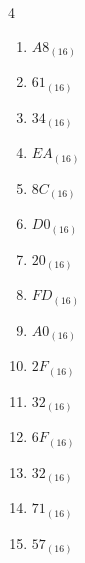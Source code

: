 \begin{multicols}{4}
\begin{enumerate}
        \phantom{$=161$}

\columnbreak %

\resetques

  \item $A8_{(16)}$

        \phantom{$=168$}

  \item $61_{(16)}$

        \phantom{$=97$}

  \item $34_{(16)}$

        \phantom{$=52$}

  \item $EA_{(16)}$

        \phantom{$=234$}

  \item $8C_{(16)}$

        \phantom{$=140$}

  \item $D0_{(16)}$

        \phantom{$=208$}

  \item $20_{(16)}$

        \phantom{$=32$}

  \item $FD_{(16)}$

        \phantom{$=253$}

  \item $A0_{(16)}$

        \phantom{$=160$}

  \item $2F_{(16)}$

        \phantom{$=47$}

  \item $32_{(16)}$

        \phantom{$=50$}

  \item $6F_{(16)}$

        \phantom{$=111$}

  \item $32_{(16)}$

        \phantom{$=50$}

  \item $71_{(16)}$

        \phantom{$=113$}

  \item $57_{(16)}$


\end{enumerate}
\end{multicols}
